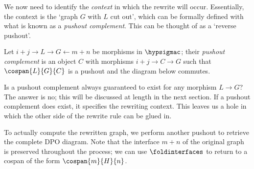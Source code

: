We now need to identify the \emph{context} in which the rewrite will occur.
Essentially, the context is the `graph \(G\) with \(L\) cut out', which can be
formally defined with what is known as a \emph{pushout complement}.
This can be thought of as a `reverse pushout'.

\begin{definition}\label{def:pushout-complement}
    Let \(i+j \to L \to G \leftarrow m+n\) be morphisms in
    \(\hypsigmac\); their \emph{pushout complement} is an object \(C\)
    with morphisms \(i+j \to C \to G\) such that \(\cospan{L}{G}{C}\) is a
    pushout and the diagram below commutes.
    \begin{center}
    \end{center}
\end{definition}

Is a pushout complement always guaranteed to exist for any morphism \(L \to G\)?
The answer is no; this will be discussed at length in the next section.
If a pushout complement does exist, it specifies the rewriting context.
This leaves us a hole in which the other side of the rewrite rule can be glued
in.

\begin{center}
\end{center}

To actually compute the rewritten graph, we perform another pushout to retrieve
the complete DPO diagram.
Note that the interface \(m+n\) of the original graph is preserved throughout
the process; we can use \(\foldinterfaces\) to return to a cospan of the form
\(\cospan{m}{H}{n}\).

